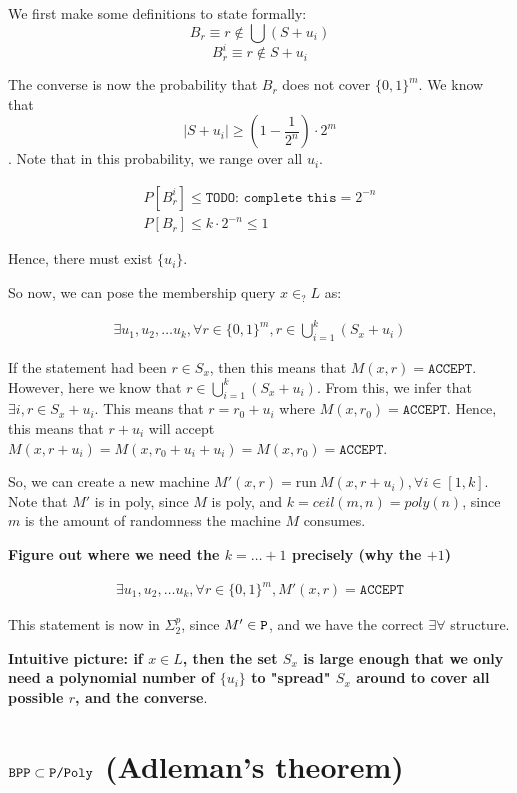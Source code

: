We first make some definitions to state formally: 
$$B_r \equiv r \notin \bigcup (S + u_i)$$
 $$B_r^i \equiv r \notin S + u_i$$

The converse is now the probability that $B_r$ does not cover $\{0, 1\}^m$.  
We know that $$|S + u_i| \geq (1 - \frac{1}{2^n}) \cdot 2^m$$.
Note that in this probability, we range over all $u_i$.

\begin{align*}
    P[B_r^i] \leq \texttt{TODO: complete this} = 2^{-n} \\
    P[B_r] \leq  k \cdot 2^{-n} \leq 1
\end{align*}

Hence, there must exist $\{ u_i \}$.


So now, we can pose the membership query $x \in_? L$ as:

\begin{align*}
    \exists u_1, u_2, \dots u_k, \forall r \in \{0, 1\}^m, r \in \bigcup_{i = 1}^k (S_x + u_i)
\end{align*}

If the statement had been $r \in S_x$, then this means that $M(x, r) = \texttt{ACCEPT}$.
However, here we know that $r \in \bigcup_{i = 1}^k (S_x + u_i)$. From this, 
we infer that $\exists i, r \in S_x + u_i$.  This means
that $r = r_0 + u_i$ where $M(x, r_0) = \texttt{ACCEPT}$. Hence, this means
that $r + u_i$ will accept $M(x, r + u_i) = M(x, r_0 + u_i + u_i) = M(x, r_0) = \texttt{ACCEPT}$.

So, we can create a new machine $M'(x, r) = \text{run}~M(x, r + u_i),  \forall i \in [1, k]$.
Note that $M'$ is in poly, since $M$ is poly, and $k = ceil(m, n) = poly(n)$, since
$m$ is the amount of randomness the machine $M$ consumes.

\textbf{Figure out where we need the $k = \dots + 1$ precisely (why the $+1$)}

\begin{align*}
    \exists u_1, u_2, \dots u_k, \forall r \in \{0, 1\}^m, M'(x, r) = \texttt{ACCEPT}
\end{align*}

This statement is now in $\Sigma_2^p$, since $M' \in \texttt{P}$, and we have the correct
$\exists \forall$ structure.


\textbf{Intuitive picture: if $x \in L$, then the set $S_x$ is large enough that we
only need a polynomial number of $\{u_i\}$ to "spread" $S_x$ around to cover all
possible $r$, and the converse}.

\section{$\texttt{BPP} \subset \texttt{P/Poly}$ (Adleman's theorem)}

